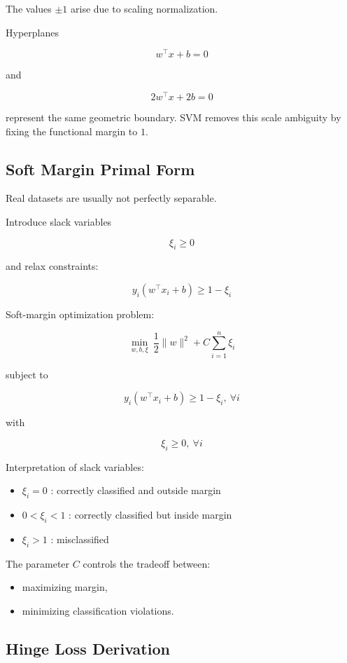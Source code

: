 \documentclass[10pt,a4paper]{article}
\begin{document}
		The values $\pm1$ arise due to scaling normalization.
		
		Hyperplanes
		
		\[
		w^\top x+b=0
		\]
		
		and
		
		\[
		2w^\top x+2b=0
		\]
		
		represent the same geometric boundary. SVM removes this scale ambiguity by fixing the functional margin to $1$.
		
		\subsection{Soft Margin Primal Form}
		
		Real datasets are usually not perfectly separable.
		
		Introduce slack variables
		
		\[
		\xi_i \ge 0
		\]
		
		and relax constraints:
		
		\[
		y_i(w^\top x_i+b)\ge1-\xi_i
		\]
		
		Soft-margin optimization problem:
		
		\[
		\min_{w,b,\xi}\ \frac{1}{2}\|w\|^2 + C\sum_{i=1}^{n}\xi_i
		\]
		
		subject to
		
		\[
		y_i(w^\top x_i+b)\ge1-\xi_i,\ \forall i
		\]
		
		with
		
		\[
		\xi_i \ge 0,\ \forall i
		\]
		
		Interpretation of slack variables:
		
		\begin{itemize}
		    \item $\xi_i=0$ : correctly classified and outside margin
		    \item $0<\xi_i<1$ : correctly classified but inside margin
		    \item $\xi_i>1$ : misclassified
		\end{itemize}
		
		The parameter $C$ controls the tradeoff between:
		
		\begin{itemize}
		    \item maximizing margin,
		    \item minimizing classification violations.
		\end{itemize}
		
		\subsection{Hinge Loss Derivation}
		
\end{document}
